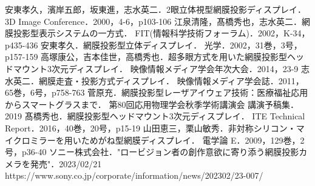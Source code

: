 \documentclass[dvipdfmx]{ujarticle}
\begin{document}
\cite{ITE2014}
\cite{ITE2016}

\begin{thebibliography}{99}
     安東孝久，濱岸五郎，坂東進，志水英二．2眼立体視型網膜投影ディスプレイ．
        3D Image Conference．2000，4-6，p103-106
     江泉清隆，髙橋秀也，志水英二．網膜投影型表示システムの一方式．
        FIT(情報科学技術フォーラム)．2002，K-34，p435-436
     安東孝久．網膜投影型立体ディスプレイ．
        光学．2002，31巻，3号，p157-159
     高塚康公，吉本佳世，高橋秀也．超多眼方式を用いた網膜投影型ヘッドマウント3次元ディスプレイ．
        映像情報メディア学会年次大会．2014，23-9
     志水英二．網膜走査・投影方式ディスプレイ．
        映像情報メディア学会誌．2011，65巻，6号，p758-763
     菅原充．網膜投影型レーザアイウェア技術：医療福祉応用からスマートグラスまで．
        第80回応用物理学会秋季学術講演会 講演予稿集．2019
     髙橋秀也．網膜投影型ヘッドマウント3次元ディスプレイ．
        ITE Technical Report．2016，40巻，20号，p15-19
     山田恵三，栗山敏秀．非対称シリコン・マイクロミラーを用いためがね型網膜ディスプレイ．
        電学論 E．2009，129巻，2号，p36-40
     ソニー株式会社．"ロービジョン者の創作意欲に寄り添う網膜投影カメラを発売"．2023/02/21
        https://www.sony.co.jp/corporate/information/news/202302/23-007/
\end{thebibliography}

\end{document}
